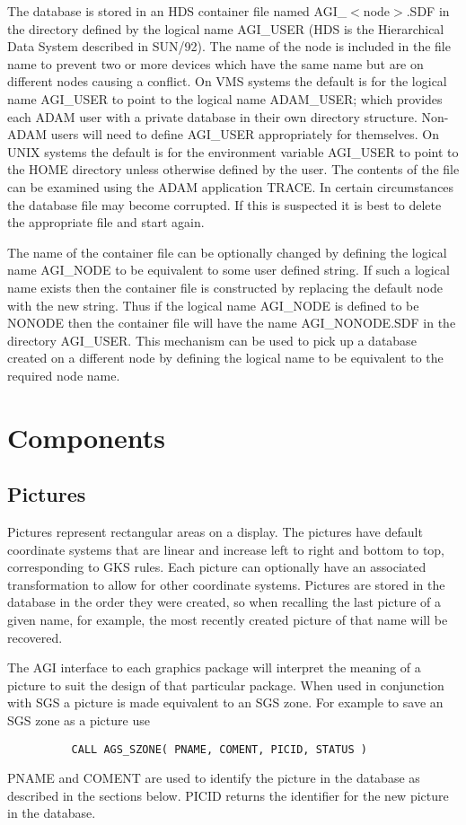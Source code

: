 The database is stored in an HDS container file named AGI\_$<$node$>$.SDF
in the directory defined by the logical name AGI\_USER
(HDS is the Hierarchical Data System described in SUN/92). The name of the
node is included in the file name to prevent two or more devices which
have the same name but are on different nodes causing a conflict.
On VMS systems the default is for the logical name AGI\_USER to point to
the logical name ADAM\_USER; which provides each ADAM user with a private
database in their own directory structure.
Non-ADAM users will need to define AGI\_USER appropriately for themselves.
On UNIX systems the default is for the environment variable AGI\_USER to
point to the HOME directory unless otherwise defined by the user.
The contents of the file can be examined using the ADAM application TRACE.
In certain circumstances the database file may become corrupted. If this
is suspected it is best to delete the appropriate file and start again.

The name of the container file can be optionally changed by defining the
logical name AGI\_NODE to be equivalent to some user defined string.
If such a logical name exists then the container file is constructed
by replacing the default node with the new string. Thus if the logical
name AGI\_NODE is defined to be NONODE then the container file will
have the name AGI\_NONODE.SDF in the directory AGI\_USER. This mechanism
can be used to pick up a database created on a different node by
defining the logical name to be equivalent to the required node name.

\section {Components}

\subsection{Pictures}

Pictures represent rectangular areas on a display.
The pictures have default coordinate systems that are linear and increase
left to right and bottom to top, corresponding to GKS rules.
Each picture can optionally have an associated transformation to allow for
other coordinate systems.
Pictures are stored in the database in the order they were created, so when
recalling the last picture of a given name, for example, the most recently
created picture of that name will be recovered.

The AGI interface to each graphics package will interpret the meaning of a
picture to suit the design of that particular package.
When used in conjunction with SGS a picture is made equivalent to an SGS zone.
For example to save an SGS zone as a picture use
\begin{verbatim}
          CALL AGS_SZONE( PNAME, COMENT, PICID, STATUS )
\end{verbatim}
PNAME and COMENT are used to identify the picture in the database as described
in the sections below.
PICID returns the identifier for the new picture in the database.

